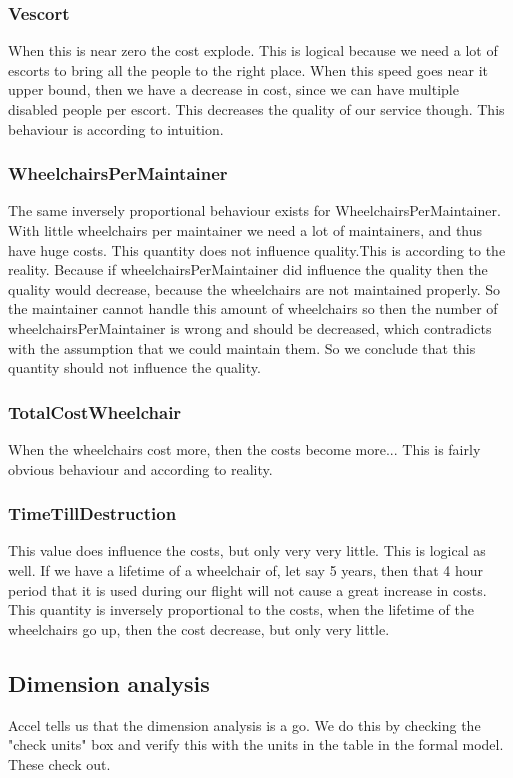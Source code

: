 \documentclass[a4paper, 11pt, notitlepage]{report}
\begin{document}
	\subsubsection{Vescort} When this is near zero the cost explode. This is logical because we need a lot of escorts to bring all the people to the right place. When this speed goes near it upper bound, then we have a decrease in cost, since we can have multiple disabled people per escort. This decreases the quality of our service though. This behaviour is according to intuition.
	\subsubsection{WheelchairsPerMaintainer} The same inversely proportional behaviour exists for WheelchairsPerMaintainer. With little wheelchairs per maintainer we need a lot of maintainers, and thus have huge costs. This quantity does not influence quality.This is according to the reality. Because if wheelchairsPerMaintainer did influence the quality then the quality would decrease, because the wheelchairs are not maintained properly. So the maintainer cannot handle this amount of wheelchairs so then the number of wheelchairsPerMaintainer is wrong and should be decreased, which contradicts with the assumption that we could maintain them. So we conclude that this quantity should not influence the quality.
	\subsubsection{TotalCostWheelchair} When the wheelchairs cost more, then the costs become more... This is fairly obvious behaviour and according to reality.
	\subsubsection{TimeTillDestruction} This value does influence the costs, but only very very little. This is logical as well. If we have a lifetime of a wheelchair of, let say 5 years, then that 4 hour period that it is used during our flight will not cause a great increase in costs. This quantity is inversely proportional to the costs, when the lifetime of the wheelchairs go up, then the cost decrease, but only very little.
	
\subsection{Dimension analysis} Accel tells us that the dimension analysis is a go. We do this by checking the "check units" box and verify this with the units in the table in the formal model. These check out.
\end{document}
